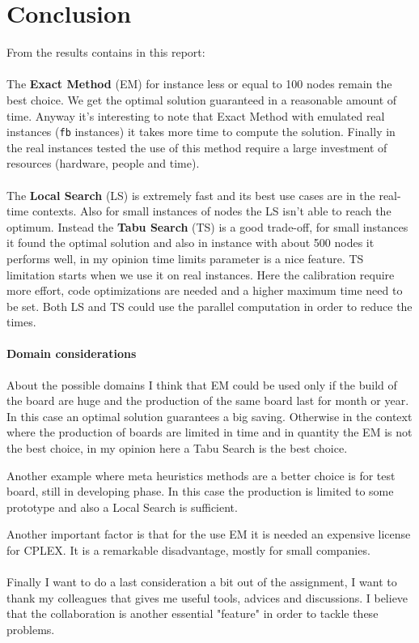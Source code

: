 \section{Conclusion}

	From the results contains in this report:
	
	\paragraph{} The \textbf{Exact Method} (EM) for instance less or equal to 100 nodes remain the best choice. We get the optimal solution guaranteed in a reasonable amount of time. Anyway it's interesting to note that Exact Method with emulated real instances (\verb|fb| instances) it takes more time to compute the solution. Finally in the real instances tested the use of this method require a large investment of resources (hardware, people and time).
	
	\paragraph{} The \textbf{Local Search} (LS) is extremely fast and its best use cases are in the real-time contexts. Also for small instances of nodes the LS isn't able to reach the optimum. Instead the \textbf{Tabu Search} (TS) is a good trade-off, for small instances it found the optimal solution and also in instance with about 500 nodes it performs well, in my opinion time limits parameter is a nice feature. TS limitation starts when we use it on real instances. Here the calibration require more effort, code optimizations are needed and a higher maximum time need to be set. Both LS and TS could use the parallel computation in order to reduce the times.
	
	\paragraph{Domain considerations} About the possible domains I think that EM could be used only if the build of the board are huge and the production of the same board last for month or year. In this case an optimal solution guarantees a big saving. Otherwise in the context where the production of boards are limited in time and in quantity the EM is not the best choice, in my opinion here a Tabu Search is the best choice.
	
	Another example where meta heuristics methods are a better choice is for test board, still in developing phase. In this case the production is limited to some prototype and also a Local Search is sufficient. 
	
	Another important factor is that for the use EM it is needed an expensive license for CPLEX. It is a remarkable disadvantage, mostly for small companies.
	
	\paragraph{} Finally I want to do a last consideration a bit out of the assignment, I want to thank my colleagues that gives me useful tools, advices and discussions. I believe that the collaboration is another essential "feature" in order to tackle these problems.

		
	
